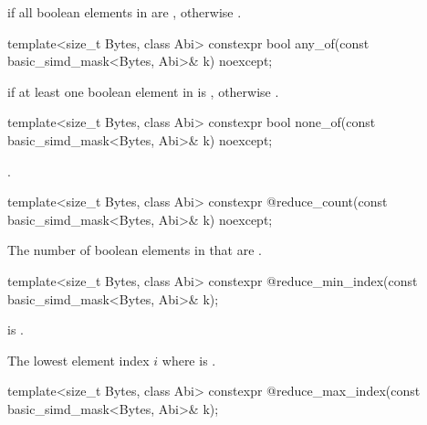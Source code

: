 \begin{itemdescr}
  \pnum\returns
   if all boolean elements in  are , otherwise .
\end{itemdescr}

\begin{itemdecl}
template<size_t Bytes, class Abi>
  constexpr bool any_of(const basic_simd_mask<Bytes, Abi>& k) noexcept;
\end{itemdecl}

\begin{itemdescr}
  \pnum\returns
   if at least one boolean element in  is , otherwise
  .
\end{itemdescr}

\begin{itemdecl}
template<size_t Bytes, class Abi>
  constexpr bool none_of(const basic_simd_mask<Bytes, Abi>& k) noexcept;
\end{itemdecl}

\begin{itemdescr}
  \pnum\returns {}.
\end{itemdescr}

\begin{itemdecl}
template<size_t Bytes, class Abi>
  constexpr @\simdsizetype@ reduce_count(const basic_simd_mask<Bytes, Abi>& k) noexcept;
\end{itemdecl}

\begin{itemdescr}
  \pnum\returns
  The number of boolean elements in  that are .
\end{itemdescr}

\begin{itemdecl}
template<size_t Bytes, class Abi>
  constexpr @\simdsizetype@ reduce_min_index(const basic_simd_mask<Bytes, Abi>& k);
\end{itemdecl}

\begin{itemdescr}
  \pnum\expects
   is .

  \pnum\returns
  The lowest element index $i$ where  is .
\end{itemdescr}

\begin{itemdecl}
template<size_t Bytes, class Abi>
  constexpr @\simdsizetype@ reduce_max_index(const basic_simd_mask<Bytes, Abi>& k);
\end{itemdecl}

